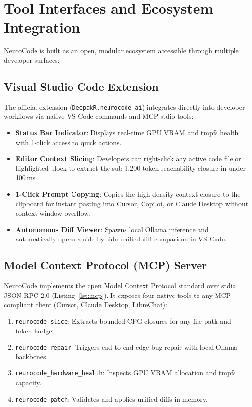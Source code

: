 \documentclass[10pt, conference]{IEEEtran}
\begin{document}
\section{Tool Interfaces and Ecosystem Integration}

NeuroCode is built as an open, modular ecosystem accessible through multiple developer surfaces:

\subsection{Visual Studio Code Extension}
The official extension (\texttt{DeepakR.neurocode-ai}) integrates directly into developer workflows via native VS Code commands and MCP stdio tools:
\begin{itemize}
    \item \textbf{Status Bar Indicator}: Displays real-time GPU VRAM and tmpfs health with 1-click access to quick actions.
    \item \textbf{Editor Context Slicing}: Developers can right-click any active code file or highlighted block to extract the sub-1,200 token reachability closure in under 100\,ms.
    \item \textbf{1-Click Prompt Copying}: Copies the high-density context closure to the clipboard for instant pasting into Cursor, Copilot, or Claude Desktop without context window overflow.
    \item \textbf{Autonomous Diff Viewer}: Spawns local Ollama inference and automatically opens a side-by-side unified diff comparison in VS Code.
\end{itemize}

\subsection{Model Context Protocol (MCP) Server}
NeuroCode implements the open Model Context Protocol standard over stdio JSON-RPC 2.0 (Listing~\ref{lst:mcp}). It exposes four native tools to any MCP-compliant client (Cursor, Claude Desktop, LibreChat):
\begin{enumerate}
    \item \texttt{neurocode\_slice}: Extracts bounded CPG closures for any file path and token budget.
    \item \texttt{neurocode\_repair}: Triggers end-to-end edge bug repair with local Ollama backbones.
    \item \texttt{neurocode\_hardware\_health}: Inspects GPU VRAM allocation and tmpfs capacity.
    \item \texttt{neurocode\_patch}: Validates and applies unified diffs in memory.
\end{enumerate}
\end{document}
